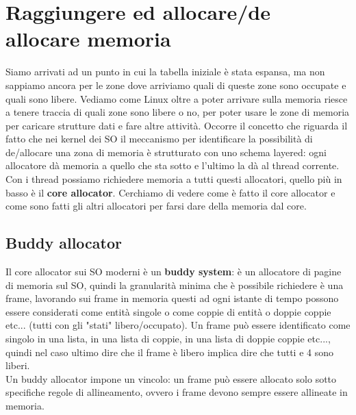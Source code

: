 \documentclass[12pt, oneside]{extbook}
\begin{document}
\section{Raggiungere ed allocare/de allocare memoria}
Siamo arrivati ad un punto in cui la tabella iniziale è stata espansa, ma non sappiamo ancora per le zone dove arriviamo quali di queste zone sono occupate e quali sono libere. Vediamo come Linux oltre a poter arrivare sulla memoria riesce a tenere traccia di quali zone sono libere o no, per poter usare le zone di memoria per caricare strutture dati e fare altre attività. Occorre il concetto che riguarda il fatto che nei kernel dei SO il meccanismo per identificare la possibilità di de/allocare una zona di memoria è strutturato con uno schema layered: ogni allocatore dà memoria a quello che sta sotto e l'ultimo la dà al thread corrente. Con i thread possiamo richiedere memoria a tutti questi allocatori, quello più in basso è il \textbf{core allocator}. Cerchiamo di vedere come è fatto il core allocator e come sono fatti gli altri allocatori per farsi dare della memoria dal core.
\subsection{Buddy allocator}
Il core allocator sui SO moderni è un \textbf{buddy system}: è un allocatore di pagine di memoria sul SO, quindi la granularità minima che è possibile richiedere è una frame, lavorando sui frame in memoria questi ad ogni istante di tempo possono essere considerati come entità singole o come coppie di entità o doppie coppie etc... (tutti con gli "stati" libero/occupato). Un frame può essere identificato come singolo in una lista, in una lista di coppie, in una lista di doppie coppie etc..., quindi nel caso ultimo dire che il frame è libero implica dire che tutti e 4 sono liberi.\\Un buddy allocator impone un vincolo: un frame può essere allocato solo sotto specifiche regole di allineamento, ovvero i frame devono sempre essere allineate in memoria.
\end{document}
